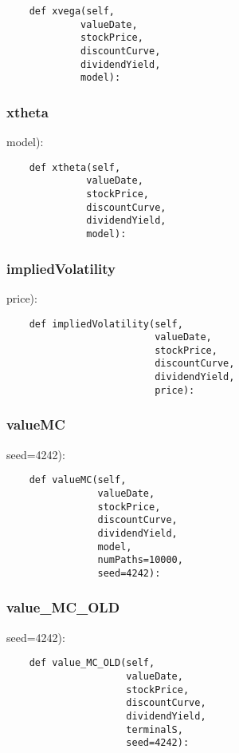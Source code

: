\documentclass[twoside,11pt]{book}
\begin{document}
\begin{lstlisting}
    def xvega(self,
             valueDate,
             stockPrice,
             discountCurve,
             dividendYield,
             model):
\end{lstlisting}

\subsubsection*{{\bf xtheta}}
model): 

\begin{lstlisting}
    def xtheta(self,
              valueDate,
              stockPrice,
              discountCurve,
              dividendYield,
              model):
\end{lstlisting}

\subsubsection*{{\bf impliedVolatility}}
price): 

\begin{lstlisting}
    def impliedVolatility(self,
                          valueDate,
                          stockPrice,
                          discountCurve,
                          dividendYield,
                          price):
\end{lstlisting}

\subsubsection*{{\bf valueMC}}
seed=4242): 

\begin{lstlisting}
    def valueMC(self,
                valueDate,
                stockPrice,
                discountCurve,
                dividendYield,
                model,
                numPaths=10000,
                seed=4242):
\end{lstlisting}

\subsubsection*{{\bf value\_MC\_OLD}}
seed=4242): 

\begin{lstlisting}
    def value_MC_OLD(self,
                     valueDate,
                     stockPrice,
                     discountCurve,
                     dividendYield,
                     terminalS,
                     seed=4242):
\end{lstlisting}
\end{document}

